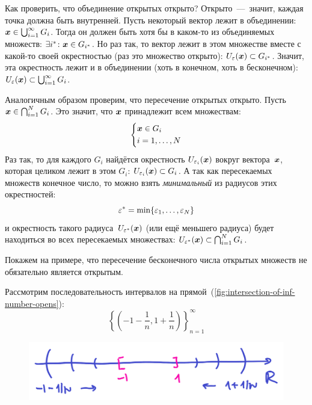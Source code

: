 \documentclass[a4paper,12pt]{article}
\begin{document}
  \begin{solution}
    Как проверить, что объединение открытых открыто?
    Открыто~---~значит, каждая точка должна быть внутренней.
    Пусть некоторый вектор лежит в объединении: $\bds x \hm\in \bigcup_{i = 1}^{\infty} G_i$.
    Тогда он должен быть хотя бы в каком-то из объединяемых множеств: $\exists i^*\colon \bds x \hm\in G_{i^*}$.
    Но раз так, то вектор лежит в этом множестве вместе с какой-то своей окрестностью (раз это множество открыто): $U_{\eps}(\bds x) \hm\subset G_{i^*}$.
    Значит, эта окрестность лежит и в объединении (хоть в конечном, хоть в бесконечном): $U_{\eps}(\bds x) \hm\subset \bigcup_{i = 1}^{\infty} G_i$.

    Аналогичным образом проверим, что пересечение открытых открыто.
    Пусть $\bds x \hm\in \bigcap_{i = 1}^{N} G_i$.
    Это значит, что $\boldsymbol x$ принадлежит всем множествам:
    \[
      \left\{
        \begin{aligned}
          &\boldsymbol x \in G_i\\
          &i = 1, \ldots, N
        \end{aligned}
      \right.
    \]
    Раз так, то для каждого $G_i$ найдётся окрестность $U_{\varepsilon_i}(\boldsymbol x)$ вокруг вектора~$\boldsymbol x$, которая целиком лежит в этом $G_i$: $U_{\eps_i}(\bds x) \hm\subset G_i$.
    А так как пересекаемых множеств конечное число, то можно взять \emph{минимальный} из радиусов этих окрестностей:
    \[
      \varepsilon^* = \min\{\varepsilon_1, \ldots, \varepsilon_N\}
    \]
    и окрестность такого радиуса~$U_{\varepsilon^*}(\boldsymbol x)$ (или ещё меньшего радиуса) будет находиться во всех пересекаемых множествах: $U_{\eps^*}(\bds x) \hm\subset \bigcap_{i = 1}^{N} G_i$.

    \medskip

    Покажем на примере, что пересечение бесконечного числа открытых множеств не обязательно является открытым.

    Рассмотрим последовательность интервалов на прямой~(\ref{fig:intersection-of-inf-number-opens}):
    \[
      \left\{
        \left(-1 - \frac{1}{n}, 1 + \frac{1}{n}\right)
      \right\}_{n = 1}^{\infty}
    \]

    \begin{figure}[ht]
      \centering
  
      \includegraphics[width=0.5\columnwidth]{intersection-of-inf-number-opens}
  

\end{figure}
\end{solution}
\end{document}
